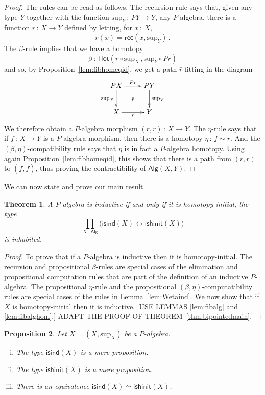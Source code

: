\documentclass[10pt,a4paper,oneside,reqno]{amsart}
\theoremstyle{mythm}
\newtheorem{theorem}{Theorem}[section]
\newtheorem{proposition}[theorem]{Proposition}
\theoremstyle{mydef}
\theoremstyle{myrmk}
\newcommand{\ie}{\text{i.e.\ }}
\newcommand{\co}{\,{:}\,}
\newcommand{\isalgind}{\mathsf{isind}}
\newcommand{\isalghinit}{\mathsf{ishinit}}
\newcommand{\Hot}{\mathsf{Hot}}
\newcommand{\rec}{\mathsf{rec}}
\newcommand{\Palg}{\mathsf{Alg}}
\renewcommand{\sup}{\mathrm{sup}}
\begin{document}
\begin{proof} The rules can be read as follows. The recursion rule says that, given any type $Y$ together 
with the function $\sup_Y \co PY \to Y$, \ie any $P$-algebra, there is a function $r \co X \to Y$
defined by letting,  for $x \co X$, 
\[
r(x) = \rec(x, \sup_Y) \, .
\]
The $\beta$-rule implies that we have a homotopy 
\[
\beta \co \Hot( r \circ \sup_X \, , \sup_Y \circ Pr)
\]
and so, by Proposition~\ref{lem:fibhomeqid}, we get a path $\bar{r}$ fitting in the diagram
\[
\xymatrix{
PX \ar[d]_{\sup_X} \ar[r]^{Pr} \ar@{}[dr]|{\bar{r}} & PY \ar[d]^{\sup_Y} \\
X \ar[r]_r & Y}
\]
We therefore obtain a $P$-algebra morphism  $(r, \bar{r}) \co X \to Y$.  The 
$\eta$-rule says that if $f \co X \to Y$ is a $P$-algebra morphism, then there is a homotopy $\eta \co f \sim r$.  
And the $(\beta,\eta)$-compatibility rule says that $\eta$ is in fact a $P$-algebra homotopy. Using again 
Proposition~\ref{lem:fibhomeqid}, this shows that there is a path from $(r, \bar{r})$ to $(f, \bar{f})$, thus
proving the contractibility of $\Palg(X,Y)$.
\end{proof}



We can now state and prove our main result. 

\begin{theorem}\label{thm:WMain} A $P$-algebra is inductive if and only if
it is homotopy-initial, \ie the type
\[ 
\prod_{X \co \Palg} \big( \isalgind(X) \leftrightarrow \isalghinit(X) \big)
\]
is inhabited. 
\end{theorem}




\begin{proof}
To prove that if a $P$-algebra is inductive then it is homotopy-initial.
 The recursion and propositional $\beta$-rules are special cases of the elimination and propositional computation rules that are part of the definition of an inductive $P$-algebra. The propositional $\eta$-rule and the
propositional $(\beta, \eta)$-computatibility rules are special cases of the rules in Lemma~\ref{lem:Wetaind}.   We now  show that if $X$ is homotopy-initial then it is inductive. [USE LEMMAS \ref{lem:fibalg} and \ref{lem:fibalghom}.]
ADAPT THE PROOF OF THEOREM~\ref{thm:bipointedmain}.
\end{proof}

\begin{proposition} Let $X = (X, \sup_X)$ be a $P$-algebra. 
\begin{enumerate}[(i)]
\item The type $\isalgind(X)$ is a mere proposition.
\item The type $\isalghinit(X)$ is a mere proposition.
\item There is an equivalence $\isalgind(X) \simeq \isalghinit(X)$.
\end{enumerate}
\end{proposition}
\end{document}
